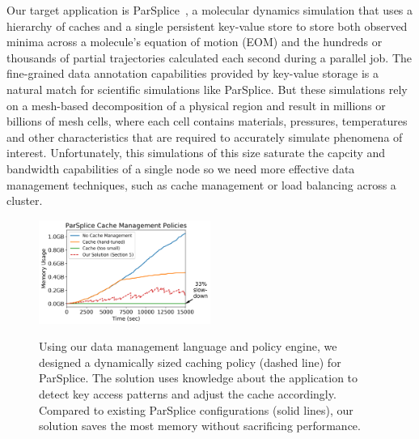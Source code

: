 Our target application is ParSplice~\cite{perez:jctc20150parsplice}, a
molecular dynamics simulation that uses a hierarchy of caches and a single
persistent key-value store to store both observed minima across a molecule's
equation of motion (EOM) and the hundreds or thousands of partial trajectories
calculated each second during a parallel job.  The fine-grained data annotation
capabilities provided by key-value storage is a natural match for scientific
simulations like ParSplice. But these simulations rely on a mesh-based
decomposition of a physical region and result in millions or billions of mesh
cells, where each cell contains materials, pressures, temperatures and other
characteristics that are required to accurately simulate phenomena of interest.
Unfortunately, this simulations of this size saturate the capcity and bandwidth
capabilities of a single node so we need more effective data management
techniques, such as cache management or load balancing across a cluster.

\begin{figure}[t]
\noindent\includegraphics[width=0.5\textwidth]{figures/cache-management.png}\\
\caption{Using our data management language and policy engine, we designed a
dynamically sized caching policy (dashed line) for ParSplice. The solution uses
knowledge about the application to detect key access patterns and adjust the
cache accordingly. Compared to existing ParSplice configurations (solid lines),
our solution saves the most memory without sacrificing performance.
\label{fig:cache-management}}
\end{figure}

